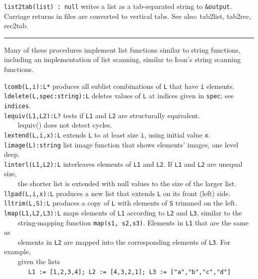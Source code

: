 \texttt{list2tab(list) : null} writes a list as a tab-separated string
to \texttt{\&output}. Carriage returns in files are converted to
vertical tabs.
See also: tab2list, tab2rec, rec2tab. 

\vspace{0.25cm}\hrule{}

Many of these procedures implement list functions
similar to string functions, including an implementation of
list scanning, similar to Icon's
string scanning functions.

\texttt{lcomb(L,i):L*} produces all sublist combinations of \texttt{L}
that have \texttt{i} elements.\\
\texttt{ldelete(L,spec:string):L} deletes values of \texttt{L} at
indices given in \texttt{spec}; see \texttt{indices}.\\
\texttt{lequiv(L1,L2):L?} tests if \texttt{L1} and \texttt{L2} are
structurally equivalent.\\
 \ \ \ \ lequiv() does not detect cycles.\\
\texttt{lextend(L,i,x):L} extends \texttt{L} to at least size
\texttt{i}, using initial value \texttt{x}.\\
\texttt{limage(L):string} list image function that shows
elements' images, one level deep.\\
\texttt{linterl(L1,L2):L} interleaves elements of \texttt{L1} and
\texttt{L2}. If \texttt{L1} and \texttt{L2} are unequal size,\\
 \ \ \ \ the shorter list is extended with null values to the
size of the larger list.\\
\texttt{llpad(L,i,x):L} produces a new list that extends \texttt{L} on
its front (left) side.\\
\texttt{lltrim(L,S):L} produces a copy of \texttt{L} with elements of
\texttt{S} trimmed on the left.\\
\texttt{lmap(L1,L2,L3):L} maps elements of \texttt{L1} according to
\texttt{L2} and \texttt{L3}, similar to the\\
 \ \ \ \ string-mapping function \texttt{map(s1, s2,s3)}. Elements in
\texttt{L1} that are the same as\\
 \ \ \ \  elements in \texttt{L2} are mapped into the corresponding elements of \texttt{L3}. For
example,\\
 \ \ \ \ given the lists\\
 \ \ \ \ \ \ \ \texttt{L1 := [1,2,3,4]; L2 := [4,3,2,1]; L3 :=
["a","b","c","d"]}\\
